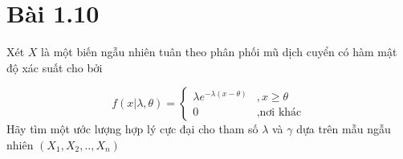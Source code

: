 \section*{Bài 1.10}
%

\begin{problem}{1.10}
Xét $X$ là một biến ngẫu nhiên tuân theo phân phối mũ dịch cuyển có hàm mật độ xác suất cho bởi

\begin{equation} 
f\left(\left.x\right|\lambda,\theta\right) = \begin{cases} \lambda e^{-\lambda\left(x-\theta\right)} & , x\geq\theta\\0 &, \textrm{nơi khác} \end{cases} 
\end{equation} 
Hãy tìm một ước lượng hợp lý cực đại cho tham số $\lambda$ và $\gamma$ dựa trên mẫu ngẫu nhiên $\left(X_1,X_2,..,X_n\right)$
\end{problem}

